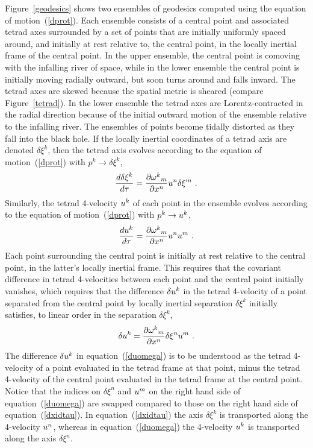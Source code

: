 \documentclass[twocolumn,showpacs,preprintnumbers,amsmath,amssymb,prb]{revtex4}
\begin{document}
Figure~\ref{geodesics}
shows two ensembles of geodesics computed
using the equation of motion~(\ref{dprot}).
Each ensemble consists of a central point
and associated tetrad axes
surrounded by a set of points that are initially uniformly spaced around,
and initially at rest relative to, the central point,
in the locally inertial frame of the central point.
In the upper ensemble,
the central point is comoving with the infalling river of space,
while in the lower ensemble
the central point is initially moving radially outward,
but soon turns around and falls inward.
The tetrad axes are skewed because the spatial metric is sheared
(compare Figure~\ref{tetrad}).
In the lower ensemble the tetrad axes are
Lorentz-contracted in the radial direction because of the initial outward motion
of the ensemble relative to the infalling river.
The ensembles of points become tidally distorted
as they fall into the black hole.
If the locally inertial coordinates of a tetrad axis
are denoted $\delta \xi^k$,
then the tetrad axis
evolves according to
the equation of motion~(\ref{dprot}) with $p^k \rightarrow \delta \xi^k$,
\begin{equation}
\label{dxidtau}
  {d\delta \xi^k \over d\tau}
  =
  {\partial {\omega^k}_m \over \partial x^n} u^n \delta \xi^m
  \ .
\end{equation}
Similarly,
the tetrad 4-velocity $u^k$ of each point in the ensemble
evolves according to
the equation of motion~(\ref{dprot}) with $p^k \rightarrow u^k$,
\begin{equation}
\label{dudtau}
  {du^k \over d\tau}
  =
  {\partial {\omega^k}_m \over \partial x^n} u^n u^m
  \ .
\end{equation}
Each point surrounding the central point
is initially at rest relative to the central point,
in the latter's locally inertial frame.
This requires that the covariant difference in tetrad 4-velocities
between each point and the central point initially vanishes,
which requires that the difference $\delta u^k$ in the tetrad 4-velocity
of a point separated from the central point by locally inertial separation
$\delta \xi^k$
initially satisfies,
to linear order in the separation $\delta \xi^k$,
\begin{equation}
\label{duomega}
  \delta u^k
  =
  {\partial {\omega^k}_m \over \partial x^n} \delta \xi^n u^m
  \ .
\end{equation}
The difference $\delta u^k$ in equation~(\ref{duomega})
is to be understood as
the tetrad 4-velocity of a point evaluated in the tetrad frame at that point,
minus the tetrad 4-velocity of the central point
evaluated in the tetrad frame at the central point.
Notice that the indices on $\delta \xi^n$ and $u^m$
on the right hand side of equation~(\ref{duomega})
are swapped compared to those
on the right hand side of equation~(\ref{dxidtau}).
In equation~(\ref{dxidtau})
the axis $\delta \xi^k$ is transported along the 4-velocity $u^n$,
whereas in equation~(\ref{duomega})
the 4-velocity $u^k$ is transported along the axis $\delta \xi^n$.
\end{document}
